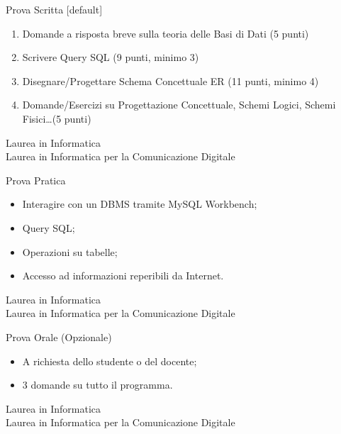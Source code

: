 \begin{frame}{Prova Scritta}
    [default]
    \begin{enumerate}
        \item Domande a risposta breve sulla teoria delle Basi di Dati (5 punti)
        \item Scrivere Query SQL (9 punti, minimo 3)
        \item Disegnare/Progettare Schema Concettuale ER (11 punti, minimo 4)
        \item Domande/Esercizi su Progettazione Concettuale, Schemi Logici, Schemi Fisici\ldots (5 punti)
    \end{enumerate}
    \vspace{1cm}
    \pause
    \centering
    Laurea in Informatica 
    \\Laurea in Informatica per la Comunicazione Digitale 
    \end{frame}
    
    \begin{frame}{Prova Pratica}
    \begin{itemize}
        \item Interagire con un DBMS tramite MySQL Workbench;
        \item Query SQL;
        \item Operazioni su tabelle;
        \item Accesso ad informazioni reperibili da Internet.
    \end{itemize}
    \vspace{1cm}
    \pause
    \centering
    Laurea in Informatica 
    \\Laurea in Informatica per la Comunicazione Digitale 
    \end{frame}
    
    \begin{frame}{Prova Orale (Opzionale)}
    \begin{itemize}
        \item A richiesta dello studente o del docente;
        \item 3 domande su tutto il programma.
    \end{itemize}
    \vspace{1cm}
    \pause
    \centering
    Laurea in Informatica 
    \\Laurea in Informatica per la Comunicazione Digitale 
    \end{frame}